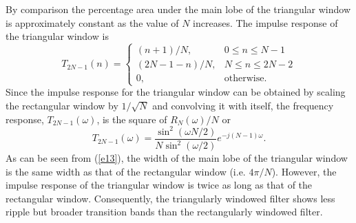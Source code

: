	By comparison the percentage area under the main lobe of 
the triangular window
 is
approximately constant as the value of $N$ increases.  
The impulse response of the triangular window is
%
\begin{equation}
T_{2N-1}(n)=
               \left\{ \begin{array}{ll}
                     (n+1)/N, & \mbox{$0\le n\le N-1$}\\
                     (2N-1-n)/N, & \mbox{$N\le n\le 2N-2$}\\
                     0, & \mbox{otherwise}.
                \end{array}
       \right.
\label{e12}
\end{equation}
%
Since the impulse response for the triangular window
can be obtained by scaling the rectangular window by $1/\sqrt{N}$
and convolving it with itself, the frequency response, $T_{2N-1}(\omega)$,
is the square of $R_N(\omega)/N$ or
%
\begin{equation}
T_{2N-1}(\omega)=\frac{\sin^2(\omega N/2)}{N\sin^2(\omega/2)}e^{-j(N-1)\omega}.
\label{e13}
\end{equation}
%
As can be seen from (\ref{e13}), the width of the main
lobe of the triangular window is the same width as that
of the rectangular window (i.e. $4\pi/N$).  However, the impulse response
of the triangular window is twice as long as that of the 
rectangular window.  Consequently, the triangularly
windowed filter shows less ripple but broader transition bands than
the rectangularly windowed filter.  

